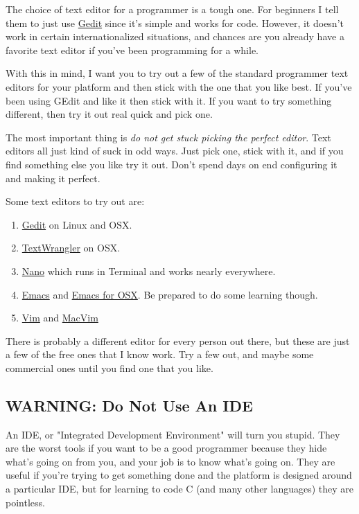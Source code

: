 The choice of text editor for a programmer is a tough one.  For beginners
I tell them to just use \href{http://projects.gnome.org/gedit/}{Gedit} since
it's simple and works for code.  However, it doesn't work in certain
internationalized situations, and chances are you already have a favorite
text editor if you've been programming for a while.

With this in mind, I want you to try out a few of the standard programmer
text editors for your platform and then stick with the one that you like
best.  If you've been using GEdit and like it then stick with it.  If you
want to try something different, then try it out real quick and pick one.

The most important thing is \emph{do not get stuck picking the perfect editor}.
Text editors all just kind of suck in odd ways.  Just pick one, stick with it,
and if you find something else you like try it out.  Don't spend days
on end configuring it and making it perfect.

Some text editors to try out are:

\begin{enumerate}
\item \href{http://projects.gnome.org/gedit/}{Gedit} on Linux and OSX.
\item \href{http://www.barebones.com/products/textwrangler/}{TextWrangler} on OSX.
\item \href{http://www.nano-editor.org/}{Nano} which runs in Terminal and works nearly everywhere.
\item \href{http://www.gnu.org/software/emacs/}{Emacs} and \href{http://emacsformacosx.com/}{Emacs for OSX}.  Be prepared to do some learning though.
\item \href{http://www.vim.org/}{Vim} and \href{http://code.google.com/p/macvim/}{MacVim}
\end{enumerate}

There is probably a different editor for every person out there, but these are
just a few of the free ones that I know work.  Try a few out, and maybe some
commercial ones until you find one that you like.

\subsection{WARNING: Do Not Use An IDE}

An IDE, or "Integrated Development Environment" will turn you stupid.  They are
the worst tools if you want to be a good programmer because they hide what's
going on from you, and your job is to know what's going on.  They are useful
if you're trying to get something done and the platform is designed around 
a particular IDE, but for learning to code C (and many other languages) they
are pointless.

